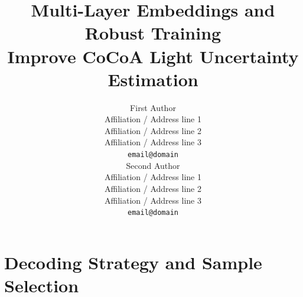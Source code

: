 \documentclass[11pt]{article}
\title{Multi-Layer Embeddings and Robust Training\\ Improve CoCoA Light Uncertainty Estimation}
\author{First Author \\
  Affiliation / Address line 1 \\
  Affiliation / Address line 2 \\
  Affiliation / Address line 3 \\
  \texttt{email@domain} \\\And
  Second Author \\
  Affiliation / Address line 1 \\
  Affiliation / Address line 2 \\
  Affiliation / Address line 3 \\
  \texttt{email@domain} \\}
\begin{document}
\maketitle
\begin{abstract}

\end{abstract}











\appendix


\section{Decoding Strategy and Sample Selection}
\label{app:decoding}
\end{document}
